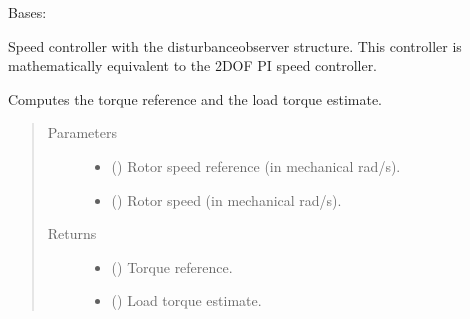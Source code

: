 \documentclass[letterpaper,10pt,english]{sphinxmanual}
\begin{document}
\begin{fulllineitems}
\label{\detokenize{control:control.common.SpeedCtrl}}
\pysigstartsignatures
{}
\pysigstopsignatures
\sphinxAtStartPar
Bases: 

\sphinxAtStartPar
Speed controller with the disturbance\sphinxhyphen{}observer structure. This controller
is mathematically equivalent to the 2DOF PI speed controller.

\begin{fulllineitems}
\label{\detokenize{control:control.common.SpeedCtrl.output}}
\pysigstartsignatures
{}
\pysigstopsignatures
\sphinxAtStartPar
Computes the torque reference and the load torque estimate.
\begin{quote}\begin{description}
\item[{Parameters}] \leavevmode\begin{itemize}
\item {} 
\sphinxAtStartPar
{} () \textendash{} Rotor speed reference (in mechanical rad/s).

\item {} 
\sphinxAtStartPar
{} () \textendash{} Rotor speed (in mechanical rad/s).

\end{itemize}

\item[{Returns}] \leavevmode
\sphinxAtStartPar
\begin{itemize}
\item {} 
\sphinxAtStartPar
{} () \textendash{} Torque reference.

\item {} 
\sphinxAtStartPar
{} () \textendash{} Load torque estimate.

\end{itemize}



\end{description}
\end{quote}
\end{fulllineitems}
\end{fulllineitems}
\end{document}
